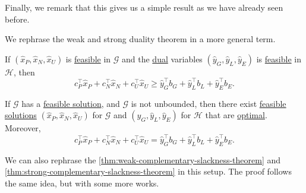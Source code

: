 Finally, we remark that this gives us a simple result as we have already seen before.
\begin{theorem*}
	We rephrase the weak and strong duality theorem in a more general term.
	\begin{theorem}\label{thm:weak-duality-theorem-general-LP}
		If \((\hat{x}_P, \hat{x}_N, \hat{x}_U)\) is \hyperref[def:feasible-solution]{feasible} in \(\mathcal{G}\) and the \hyperref[def:dual]{dual} variables
		\((\hat{y}_G, \hat{y}_L, \hat{y}_E)\) is \hyperref[def:feasible-solution]{feasible} in \(\mathcal{H}\), then
		\[
			c^{\top}_P \hat{x}_P + c^{\top}_N \hat{x}_N + c^{\top}_U \hat{x}_U \geq \hat{y}^{\top}_G b_G + \hat{y}^{\top}_L b_L + \hat{y}^{\top}_E b_E.
		\]
	\end{theorem}
	\begin{theorem}\label{thm:strong-duality-theorem-general-LP}
		If \(\mathcal{G}\) has a \hyperref[def:feasible-solution]{feasible solution}, and \(\mathcal{G}\) is not unbounded, then there exist \hyperref[def:feasible-solution]{feasible solutions}
		\((\hat{x}_P, \hat{x}_N, \hat{x}_U)\) for \(\mathcal{G}\) and \((\hat{y}_G, \hat{y}_L, \hat{y}_E)\) for \(\mathcal{H}\) that are \hyperref[def:optimal-solution]{optimal}.
		Moreover,
		\[
			c^{\top}_P \hat{x}_P + c^{\top}_N \hat{x}_N + c^{\top}_U \hat{x}_U = \hat{y}^{\top}_G b_G + \hat{y}^{\top}_L b_L + \hat{y}^{\top}_E b_E.
		\]
	\end{theorem}
\end{theorem*}

\begin{remark}
	We can also rephrase the \autoref{thm:weak-complementary-slackness-theorem} and \autoref{thm:strong-complementary-slackness-theorem}
	in this setup. The proof follows the same idea, but with some more works.
\end{remark}